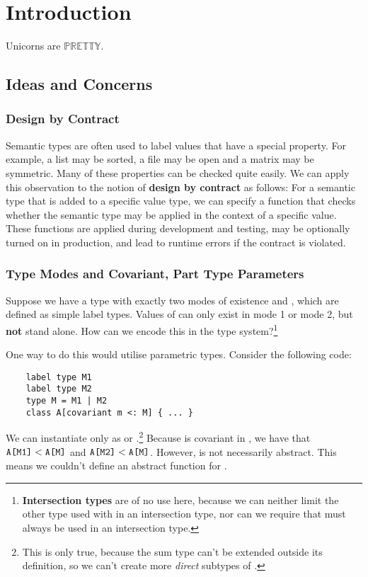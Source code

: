 \chapter{Introduction}

Unicorns are $\mathbb{PRETTY}$.


\section{Ideas and Concerns}

\subsection{Design by Contract}
Semantic types are often used to label values that have a special property. For example, a list may be sorted, a file may be open and a matrix may be symmetric. Many of these properties can be checked quite easily. We can apply this observation to the notion of \textbf{design by contract} as follows: For a semantic type that is added to a specific value type, we can specify a function that checks whether the semantic type may be applied in the context of a specific value. These functions are applied during development and testing, may be optionally turned on in production, and lead to runtime errors if the contract is violated.

\subsection{Type Modes and Covariant, Part Type Parameters}
Suppose we have a type  with exactly two modes of existence  and , which are defined as simple label types. Values of  can only exist in mode 1 or mode 2, but \textbf{not} stand alone. How can we encode this in the type system?\footnote{\textbf{Intersection types} are of no use here, because we can neither limit the other type used with  in an intersection type, nor can we require that  must always be used in an intersection type.}

One way to do this would utilise parametric types. Consider the following code:

\begin{lstlisting}
    label type M1
    label type M2
    type M = M1 | M2
    class A[covariant m <: M] { ... }
\end{lstlisting}

We can instantiate  only as  or .\footnote{This is only true, because the sum type can't be extended outside its definition, so we can't create more \textit{direct} subtypes of .} Because  is covariant in , we have that $\texttt{A[M1]} < \texttt{A[M]}$ and $\texttt{A[M2]} < \texttt{A[M]}$. However,  is not necessarily abstract. This means we couldn't define an abstract function for . 


